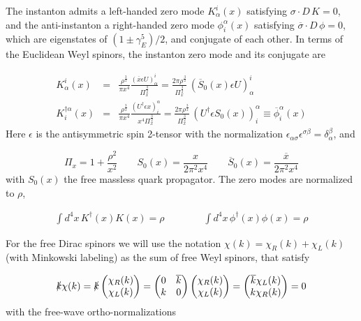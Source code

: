 \documentclass[11pt,aps,amsmath,amssymb,nofootinbib,notitlepage,longbibliography]{revtex4-1}
\newcommand{\bea}{\begin{eqnarray}}
\newcommand{\eea}{\end{eqnarray}}
\begin{document}
The instanton admits a left-handed zero mode $K^i_\alpha(x)$  satisfying $\sigma\cdot D\,K=0$,
and the anti-instanton a right-handed zero mode $\phi^\alpha_i(x)$ satisfying $\overline\sigma\cdot D\,\phi=0$,
which are eigenstates of $(1\pm\gamma_E^5)/2$, and conjugate of each other.
In terms of the Euclidean Weyl spinors,  the instanton zero mode  and its
conjugate are



\begin{eqnarray}
\label{LR}
K^i_\alpha(x)&=&\frac{\rho^{\frac 32}}{\pi x^4}\frac{(\overline{x}\epsilon U)^i_\alpha}{\Pi_x^{\frac 32}}
=\frac{2\pi\rho^{\frac 32}}{\Pi_x^{\frac 32}}\,(\overline{S}_0(x)\epsilon U)^i_\alpha
\nonumber\\
K^{\dagger\alpha}_i(x)&=&\frac{\rho^{\frac 32}}{\pi x^4}\frac{(U^\dagger\epsilon x)^\alpha_i}{x^4\Pi_x^{\frac 32}}
=\frac{2\pi\rho^{\frac 32}}{\Pi_x^{\frac 32}}\,(U^\dagger\epsilon {S}_0(x))_i^\alpha\equiv {\overline\phi}^\alpha_i(x)
\end{eqnarray}
Here $\epsilon$ is the antisymmetric spin 2-tensor with the normalization
$\epsilon_{\alpha\sigma}\epsilon^{\sigma\beta}=\delta_\alpha^\beta$, and


\begin{equation}
\Pi_x=1+\frac{\rho^2}{x^2}\qquad S_0(x)=\frac{x}{2\pi^2x^4}\qquad  \overline{S}_0(x)=\frac{\overline x}{2\pi^2x^4}
\end{equation}
with $S_0(x)$ the free massless quark propagator.
The zero modes  are normalized to $\rho$,

\bea
\int d^4x\, K^\dagger(x) K(x)=\rho\qquad \qquad \int d^4x \,\phi^\dagger(x)\phi(x)=\rho
\eea


For the free Dirac spinors we will use the notation $\chi(k)=\chi_R(k)+\chi_L(k)$  (with Minkowski labeling) as  the sum of  free Weyl spinors,  that  satisfy


\begin{eqnarray}
\label{FREEX}
\slashed k\chi(k) =\slashed  k
\begin{pmatrix}
\chi_R(k) \\
\chi_L(k) \\
\end{pmatrix}
=
\begin{pmatrix}
0&\overline{k} \\
k& 0\\
\end{pmatrix}
\begin{pmatrix}
\chi_R(k)\\
\chi_L(k) \\
\end{pmatrix}
=
\begin{pmatrix}
\overline{k}\chi_L(k) \\
k\chi_R(k)\\
\end{pmatrix}
=0
\end{eqnarray}
with the free-wave ortho-normalizations
\end{document}
